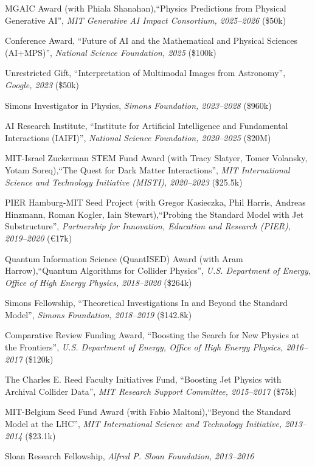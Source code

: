 \bbl
\item MGAIC Award (with Phiala Shanahan),``Physics Predictions from Physical Generative AI'', \textit{MIT Generative AI Impact Consortium, 2025--2026}
(\$50k)
\item Conference Award, ``Future of AI and the Mathematical and Physical Sciences (AI+MPS)'', \textit{National Science Foundation, 2025}
(\$100k)
\item Unrestricted Gift, ``Interpretation of Multimodal Images from Astronomy'', \textit{Google, 2023}
(\$50k)
\item Simons Investigator in Physics, \textit{Simons Foundation, 2023--2028}
(\$960k)
\item AI Research Institute, ``Institute for Artificial Intelligence and Fundamental Interactions (IAIFI)'', \textit{National Science Foundation, 2020--2025}
(\$20M)
\item MIT-Israel Zuckerman STEM Fund Award (with Tracy Slatyer, Tomer Volansky, Yotam Soreq),``The Quest for Dark Matter Interactions'', \textit{MIT International Science and Technology Initiative (MISTI), 2020--2023}
(\$25.5k)
\item PIER Hamburg-MIT Seed Project (with Gregor Kasieczka, Phil Harris, Andreas Hinzmann, Roman Kogler, Iain Stewart),``Probing the Standard Model with Jet Substructure'', \textit{Partnership for Innovation, Education and Research (PIER), 2019--2020}
(\euro17k)
\item Quantum Information Science (QuantISED) Award (with Aram Harrow),``Quantum Algorithms for Collider Physics'', \textit{U.S. Department of Energy, Office of High Energy Physics, 2018--2020}
(\$264k)
\item Simons Fellowship, ``Theoretical Investigations In and Beyond the Standard Model'', \textit{Simons Foundation, 2018--2019}
(\$142.8k)
\item Comparative Review Funding Award, ``Boosting the Search for New Physics at the Frontiers'', \textit{U.S. Department of Energy, Office of High Energy Physics, 2016--2017}
(\$120k)
\item The Charles E. Reed Faculty Initiatives Fund, ``Boosting Jet Physics with Archival Collider Data'', \textit{MIT Research Support Committee, 2015--2017}
(\$75k)
\item MIT-Belgium Seed Fund Award (with Fabio Maltoni),``Beyond the Standard Model at the LHC'', \textit{MIT International Science and Technology Initiative, 2013--2014}
(\$23.1k)
\item Sloan Research Fellowship, \textit{Alfred P. Sloan Foundation, 2013--2016}
